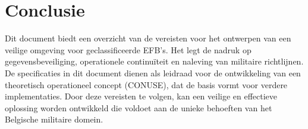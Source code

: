 \documentclass{hogent-article}
\begin{document}
    
    \section{Conclusie}
    Dit document biedt een overzicht van de vereisten voor het ontwerpen van een veilige omgeving voor geclassificeerde EFB's. Het legt de nadruk op gegevensbeveiliging, operationele continuïteit en naleving van militaire richtlijnen. De specificaties in dit document dienen als leidraad voor de ontwikkeling van een theoretisch operationeel concept (CONUSE), dat de basis vormt voor verdere implementaties. Door deze vereisten te volgen, kan een veilige en effectieve oplossing worden ontwikkeld die voldoet aan de unieke behoeften van het Belgische militaire domein.
    
\end{document}

